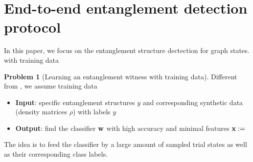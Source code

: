 \documentclass[
reprint,
aps,
pra,
floatfix,
]{revtex4-2}
\theoremstyle{plain}
\theoremstyle{definition}
\newtheorem{problem}{Problem}
\newcommand{\dm}{\rho}
\begin{document}
\section{End-to-end entanglement detection protocol}

In this paper, we focus on the entanglement structure dectection for graph states.
with training data
\begin{problem}[Learning an entanglement witness with training data]
	Different from , we assume training data
	\begin{itemize}
		\item \textbf{Input}: specific entanglement structures $y$ and corresponding synthetic data (density matrices $\dm$) with labels $y$
		\item \textbf{Output}: find the classifier $\vb{w}$ with high accuracy and minimal features $\vb{x}:=$
	\end{itemize}
\end{problem}
The idea is to feed the classifier by a large amount of sampled trial states
as well as their corresponding class labels.



\end{document}
